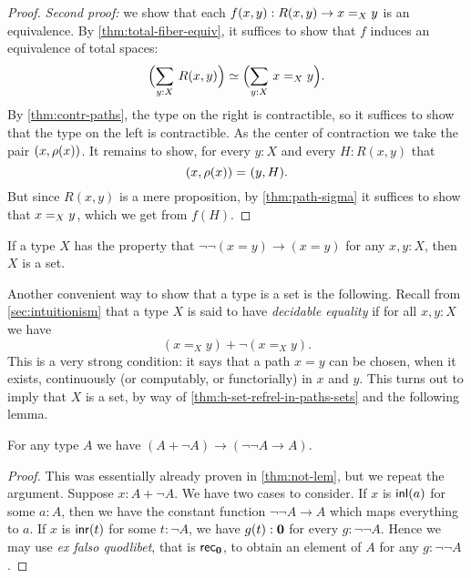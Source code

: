 \begin{proof}
  \emph{Second proof:} we show that each $f(x,y) : R(x,y) \to \id[X]{x}{y}$ is an equivalence.
  By \cref{thm:total-fiber-equiv}, it suffices to show that $f$ induces an equivalence of total spaces:
  \begin{equation*}
    \eqv{\Parens{\sm{y:X}R(x,y)}}{\Parens{\sm{y:X}\id[X]{x}{y}}}.
  \end{equation*}
  By \cref{thm:contr-paths}, the type on the right is contractible, so it
  suffices to show that the type on the left is contractible. As the center of
  contraction we take the pair $\pairr{x,\rho(x)}$.  It remains to show, for
  every ${y:X}$ and every ${H:R(x,y)}$ that
  \begin{equation*}
    \id{\pairr{x,\rho(x)}}{\pairr{y,H}}.
  \end{equation*}
  But since $R(x,y)$ is a mere proposition, by \cref{thm:path-sigma} it suffices to show that
  $\id[X]{x}{y}$, which we get from $f(H)$.
\end{proof}

\begin{cor}\label{notnotstable-equality-to-set}
  If a type $X$ has the property that $\neg\neg(x=y)\to(x=y)$ for any $x,y:X$, then $X$ is a set.
\end{cor}

Another convenient way to show that a type is a set is the following.
Recall from \cref{sec:intuitionism} that a type $X$ is said to have \emph{decidable equality}
%
if for all $x, y : X$ we have
\[(x =_X y) + \neg (x =_X y).\]
%
%
This is a very strong condition: it says that a path $x=y$ can be chosen, when it exists, continuously (or computably, or functorially) in $x$ and $y$.
This turns out to imply that $X$ is a set, by way of \cref{thm:h-set-refrel-in-paths-sets} and the following lemma.

\begin{lem}\label{lem:hedberg-helper}
For any type $A$ we have $(A+\neg A)\to(\neg\neg A\to A)$.
\end{lem}

\begin{proof}
This was essentially already proven in \cref{thm:not-lem}, but we repeat the argument.
Suppose $x:A+\neg A$. We have two cases to consider.
If $x$ is $\inl(a)$ for some $a:A$, then we have the constant function $\neg\neg A
\to A$ which maps everything to $a$. If $x$ is $\inr(t)$ for some $t:\neg A$,
we have $g(t):\emptyt$ for every $g:\neg\neg A$. Hence we may use
\emph{ex falso quodlibet}, that is $\rec{\emptyt}$, to obtain an element of $A$ for any $g:\neg\neg A$.
\end{proof}

